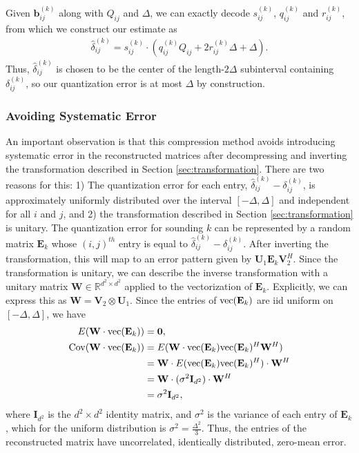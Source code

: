 \documentclass{article}
\begin{document}
Given $\mathbf{b}^{(k)}_{ij}$ along with $Q_{ij}$ and $\Delta$, we can exactly decode $s^{(k)}_{ij}$, $q^{(k)}_{ij}$ and $r^{(k)}_{ij}$, from which we construct our estimate as 
\begin{align} 
\hat{\delta}^{(k)}_{ij} = s^{(k)}_{ij} \cdot \left( q^{(k)}_{ij} Q_{ij} + 2 r^{(k)}_{ij} \Delta + \Delta \right). 
\end{align} 
Thus, $\hat{\delta}^{(k)}_{ij}$ is chosen to be the center of the length-$2 \Delta$ subinterval containing ${\delta}^{(k)}_{ij}$, so our quantization error is at most $\Delta$ by construction. 

\subsubsection{Avoiding Systematic Error}
\label{sec:no_systematic_error} 
An important observation is that this compression method avoids introducing systematic error in the reconstructed matrices after decompressing and inverting the transformation described in Section \ref{sec:transformation}. There are two reasons for this: 1) The quantization error for each entry, $\hat{\delta}^{(k)}_{ij} - {\delta}^{(k)}_{ij}$, is approximately uniformly distributed over the interval $[-\Delta, \Delta]$ and independent for all $i$ and $j$, and 2) the transformation described in Section \ref{sec:transformation} is unitary. The quantization error for sounding $k$ can be represented by a random matrix $\mathbf{E}_k$ whose $(i,j)^{th}$ entry is equal to $\hat{\delta}^{(k)}_{ij} - {\delta}^{(k)}_{ij}$. After inverting the transformation, this will map to an error pattern given by $\mathbf{U}_1 \mathbf{E}_k \mathbf{V}_2^H$. Since the transformation is unitary, we can describe the inverse transformation with a unitary matrix $\mathbf{W} \in \mathbb{R}^{d^2 \times d^2}$ applied to the vectorization of $\mathbf{E}_k$. Explicitly, we can express this as $\mathbf{W} = \mathbf{V}_2 \otimes \mathbf{U}_1$. Since the entries of ${\rm vec}(\mathbf{E}_k)$ are iid uniform on $[- \Delta, \Delta]$, we have 
\begin{align} 
E(\mathbf{W} \cdot {\rm vec}(\mathbf{E}_k)) & = \mathbf{0}, \\ 
{\rm Cov}(\mathbf{W} \cdot {\rm vec}(\mathbf{E}_k) ) & = E(\mathbf{W} \cdot {\rm vec}(\mathbf{E}_k) {\rm vec}(\mathbf{E}_k)^H \mathbf{W}^H) \\ 
& = \mathbf{W} \cdot E({\rm vec}(\mathbf{E}_k) {\rm vec}(\mathbf{E}_k)^H )\cdot  \mathbf{W}^H \\ 
& = \mathbf{W} \cdot (\sigma^2 \mathbf{I}_{d^2}) \cdot  \mathbf{W}^H \\ 
& = \sigma^2 \mathbf{I}_{d^2}, 
\end{align} 
where $\mathbf{I}_{d^2}$ is the $d^2 \times d^2$ identity matrix, and $\sigma^2$ is the variance of each entry of $\mathbf{E}_k$, which for the uniform distribution is $\sigma^2 = \frac{\Delta^2}{3}$. Thus, the entries of the reconstructed matrix have uncorrelated, identically distributed, zero-mean error. 
\end{document}
